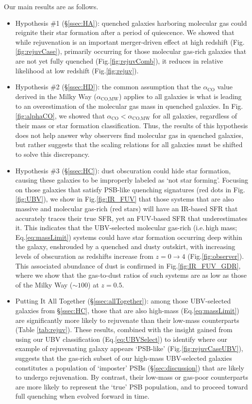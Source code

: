 \documentclass[twocolumn, linenumbers]{aastex631}
\newcommand{\eq}{Eq.\hspace{.2em}}
\renewcommand{\fig}{Fig.\hspace{.2em}}
\newcommand{\aco}{\alpha_\text{CO}}
\newcommand{\acomw}{\alpha_{\text{CO,MW}}}
\begin{document}
Our main results are as follows.
\begin{itemize}[nosep]
    \vspace*{.05in}
    \item Hypothesis \#1 (\S\ref{ssec:HA}):  quenched galaxies harboring molecular gas could reignite their star formation after a period of quiescence.  We showed that while rejuvenation is an important merger-driven effect at high redshift (\fig \ref{fig:rejuvCase}), primarily occurring for those molecular gas-rich galaxies that are not yet fully quenched (\fig \ref{fig:rejuvComb}), it reduces in relative likelihood at low redshift (\fig \ref{fig:rejuv}).
    \vspace*{.1in}
    \item Hypothesis \#2 (\S\ref{ssec:HD}):  the common assumption that the $\aco$ value derived in the Milky Way ($\acomw$) applies to all galaxies is what is leading to an overestimation of the molecular gas mass in quenched galaxies. In \fig \ref{fig:alphaCO}, we showed that $\aco<\acomw$ for all galaxies, regardless of their mass or star formation classification.  Thus, the results of this hypothesis does not help answer why observers find molecular gas in quenched galaxies, but rather suggests that the scaling relations for all galaxies must be shifted to solve this discrepancy.
    \vspace*{.1in}
    \item Hypothesis \#3 (\S\ref{ssec:HC}):  dust obscuration could hide star formation, causing these galaxies to be improperly labeled as `not star forming'.  Focusing on those galaxies that satisfy PSB-like quenching signatures (red dots in \fig \ref{fig:UBV}), we show in \fig \ref{fig:IR_FUV} that those systems that are also massive and molecular gas-rich (red stars) will have an IR-based SFR that accurately traces their true SFR, yet an FUV-based SFR that underestimates it.  This indicates that the UBV-selected molecular gas-rich (i.e.\,high mass; \eq\ref{eq:massLimit}) systems could have star formation occurring deep within the galaxy, enshrouded by a quenched and dusty outskirt, with increasing levels of obscuration as redshifts increase from $z=0\to 4$ (\fig\ref{fig:observer}). This associated abundance of dust is confirmed in \fig \ref{fig:IR_FUV_GDR}, where we show that the gas-to-dust ratios of such systems are as low as those of the Milky Way ($\sim 100$) at $z=0.5$.
    \vspace*{.1in}
    \item Putting It All Together (\S\ref{ssec:allTogether}): among those UBV-selected galaxies from \S\ref{ssec:HC}, those that are also high-mass (\eq\ref{eq:massLimit}) are significantly more likely to rejuvenate than their low-mass counterparts (Table \ref{tab:rejuv}).  These results, combined with the insight gained from using our UBV classification (\eq\ref{eq:UBVSelect}) to identify where our example of rejuvenating galaxy appears `PSB-like' (\fig \ref{fig:rejuvCaseUBV}), suggests that the gas-rich subset of our high-mass UBV-selected galaxies constitutes a population of `imposter' PSBs (\S\ref{sec:discussion}) that are likely to undergo rejuvenation.  By contrast, their low-mass or gas-poor counterparts are more likely to represent the `true' PSB population, and to proceed toward full quenching when evolved forward in time.

\end{itemize}
\end{document}
